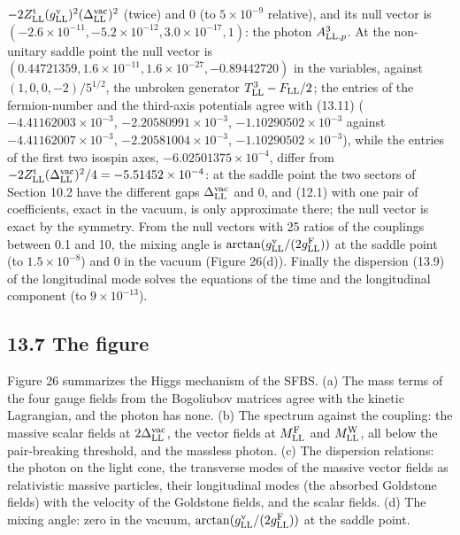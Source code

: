 \documentclass[
  10pt,
]{article}
\begin{document}
\(-2Z^{\rm t}_{\rm LL}(g^{\rm v}_{\rm LL})^2(\Delta^{\rm vac}_{\rm LL})^2\)
(twice) and 0 (to \(5\times10^{-9}\) relative), and its null vector is
\((-2.6\times10^{-11},-5.2\times10^{-12},3.0\times10^{-17},1)\): the
photon \(A^3_{{\rm LL},p}\). At the non-unitary saddle point the null
vector is
\((0.44721359,1.6\times10^{-11},1.6\times10^{-27},-0.89442720)\) in the
variables, against \((1,0,0,-2)/5^{1/2}\), the unbroken generator
\(T^3_{\rm LL}-F_{\rm LL}/2\); the entries of the fermion-number and the
third-axis potentials agree with (13.11) (\(-4.41162003\times10^{-3}\),
\(-2.20580991\times10^{-3}\), \(-1.10290502\times10^{-3}\) against
\(-4.41162007\times10^{-3}\), \(-2.20581004\times10^{-3}\),
\(-1.10290502\times10^{-3}\)), while the entries of the first two
isospin axes, \(-6.02501375\times10^{-4}\), differ from
\(-2Z^{\rm t}_{\rm LL}(\Delta^{\rm vac}_{\rm LL})^2/4=-5.51452\times10^{-4}\):
at the saddle point the two sectors of Section 10.2 have the different
gaps \(\Delta^{\rm vac}_{\rm LL}\) and 0, and (12.1) with one pair of
coefficients, exact in the vacuum, is only approximate there; the null
vector is exact by the symmetry. From the null vectors with 25 ratios of
the couplings between 0.1 and 10, the mixing angle is
\(\arctan(g^{\rm v}_{\rm LL}/(2g^{\rm F}_{\rm LL}))\) at the saddle
point (to \(1.5\times10^{-8}\)) and 0 in the vacuum (Figure 26(d)).
Finally the dispersion (13.9) of the longitudinal mode solves the
equations of the time and the longitudinal component (to
\(9\times10^{-13}\)).

\hypertarget{the-figure-2}{%
\subsection{13.7 The figure}\label{the-figure-2}}

Figure 26 summarizes the Higgs mechanism of the SFBS. (a) The mass terms
of the four gauge fields from the Bogoliubov matrices agree with the
kinetic Lagrangian, and the photon has none. (b) The spectrum against
the coupling: the massive scalar fields at
\(2\Delta^{\rm vac}_{\rm LL}\), the vector fields at
\(M^{\rm F}_{\rm LL}\) and \(M^{\rm W}_{\rm LL}\), all below the
pair-breaking threshold, and the massless photon. (c) The dispersion
relations: the photon on the light cone, the transverse modes of the
massive vector fields as relativistic massive particles, their
longitudinal modes (the absorbed Goldstone fields) with the velocity of
the Goldstone fields, and the scalar fields. (d) The mixing angle: zero
in the vacuum, \(\arctan(g^{\rm v}_{\rm LL}/(2g^{\rm F}_{\rm LL}))\) at
the saddle point.
\end{document}
